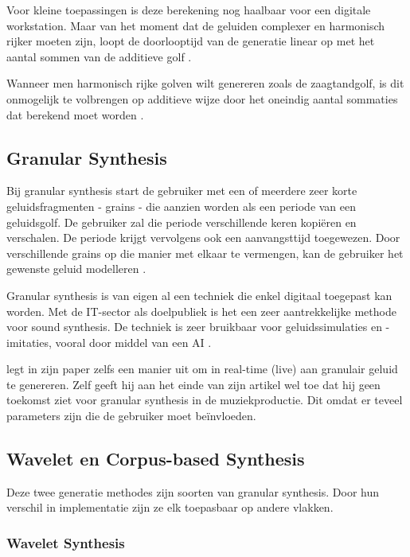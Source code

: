 Voor kleine toepassingen is deze berekening nog haalbaar voor een digitale workstation. Maar van het moment dat de geluiden complexer en harmonisch rijker moeten zijn, loopt de doorlooptijd van de generatie linear op met het aantal sommen van de additieve golf \autocite{additive}.

Wanneer men harmonisch rijke golven wilt genereren zoals de zaagtandgolf, is dit onmogelijk te volbrengen op additieve wijze door het oneindig aantal sommaties dat berekend moet worden \autocite{harmonics}.

\subsection{Granular Synthesis}

Bij granular synthesis start de gebruiker met een of meerdere zeer korte geluidsfragmenten - grains - die aanzien worden als een periode van een geluidsgolf. De gebruiker zal die periode verschillende keren kopiëren en verschalen. De periode krijgt vervolgens ook een aanvangsttijd toegewezen. Door verschillende grains op die manier met elkaar te vermengen, kan de gebruiker het gewenste geluid modelleren \autocite{granular}.

Granular synthesis is van eigen al een techniek die enkel digitaal toegepast kan worden. Met de IT-sector als doelpubliek is het een zeer aantrekkelijke methode voor sound synthesis. De techniek is zeer bruikbaar voor geluidssimulaties en -imitaties, vooral door middel van een AI \autocite{granular}.

\textcite{granular} legt in zijn paper zelfs een manier uit om in real-time (live) aan granulair geluid te genereren. Zelf geeft hij aan het einde van zijn artikel wel toe dat hij geen toekomst ziet voor granular synthesis in de muziekproductie. Dit omdat er teveel parameters zijn die de gebruiker moet beïnvloeden.

\subsection{Wavelet en Corpus-based Synthesis}

Deze twee generatie methodes zijn soorten van granular synthesis. Door hun verschil in implementatie zijn ze elk toepasbaar op andere vlakken.

\subsubsection{Wavelet Synthesis}


